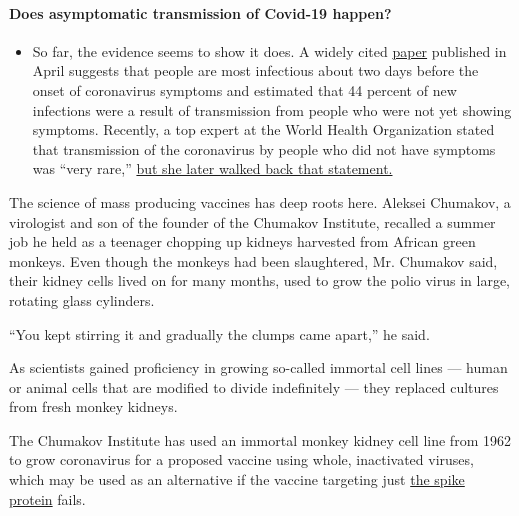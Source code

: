 \begin{itemize}
{  \paragraph{Does asymptomatic transmission of Covid-19
  happen?}\label{does-asymptomatic-transmission-of-covid-19-happen}}

  \begin{itemize}
  \tightlist
  \item
    So far, the evidence seems to show it does. A widely cited
    \href{https://www.nature.com/articles/s41591-020-0869-5}{paper}
    published in April suggests that people are most infectious about
    two days before the onset of coronavirus symptoms and estimated that
    44 percent of new infections were a result of transmission from
    people who were not yet showing symptoms. Recently, a top expert at
    the World Health Organization stated that transmission of the
    coronavirus by people who did not have symptoms was ``very rare,''
    \href{https://www.nytimes.com/2020/06/09/world/coronavirus-updates.html?action=click\&pgtype=Article\&state=default\&region=MAIN_CONTENT_3\&context=storylines_faq\#link-1f302e21}{but
    she later walked back that statement.}
  \end{itemize}
\end{itemize}

The science of mass producing vaccines has deep roots here. Aleksei
Chumakov, a virologist and son of the founder of the Chumakov Institute,
recalled a summer job he held as a teenager chopping up kidneys
harvested from African green monkeys. Even though the monkeys had been
slaughtered, Mr. Chumakov said, their kidney cells lived on for many
months, used to grow the polio virus in large, rotating glass cylinders.

``You kept stirring it and gradually the clumps came apart,'' he said.

As scientists gained proficiency in growing so-called immortal cell
lines --- human or animal cells that are modified to divide indefinitely
--- they replaced cultures from fresh monkey kidneys.

The Chumakov Institute has used an immortal monkey kidney cell line from
1962 to grow coronavirus for a proposed vaccine using whole, inactivated
viruses, which may be used as an alternative if the vaccine targeting
just
\href{https://www.nytimes.com/2020/07/28/health/coronavirus-mutation-spike-treatment.html?action=click\&module=Latest\&pgtype=Homepage}{the
spike protein} fails.

